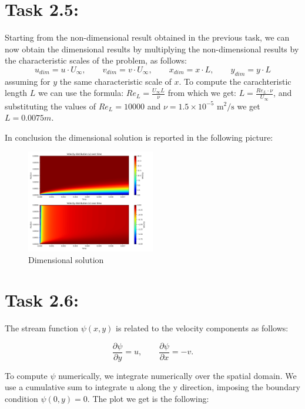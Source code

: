 \documentclass{article}
\begin{document}
\section*{\Large Task 2.5:}
Starting from the non-dimensional result obtained in the previous task, we can now obtain the dimensional results by multiplying the non-dimensional results by the characteristic scales of the problem, as follows:
\[
u_{dim} = u \cdot U_{\infty}, \qquad v_{dim} = v \cdot U_{\infty}, \qquad x_{dim} = x \cdot L, \qquad y_{dim} = y \cdot L
\]
assuming for $y$ the same characteristic scale of $x$.
To compute the carachteristic length $L$ we can use the formula: $Re_L = \frac{U_{\infty} L}{\nu}$
from which we get: $L = \frac{Re_L \cdot \nu}{U_{\infty}}$, and substituting the values of $Re_L = 10000$ and $\nu = 1.5 \times 10^{-5} \text{ m}^2/\text{s}$ we get $L = 0.0075 m$.

In conclusion the dimensional solution is reported in the following picture:
\begin{figure}[h!]
  \centering
  \includegraphics[width=0.5\textwidth]{result2.png}
  \caption{Dimensional solution}
\end{figure}

\section*{\Large Task 2.6:}
The stream function $\psi(x, y)$ is related to the velocity components as follows:

\begin{equation}
\frac{\partial \psi}{\partial y} = u, \qquad \frac{\partial \psi}{\partial x} = -v.
\end{equation}

To compute $\psi$ numerically, we integrate numerically over the spatial domain. We use a cumulative sum to integrate u along the y direction, imposing the boundary condition $\psi(0, y) = 0$.
The plot we get is the following:
\end{document}
